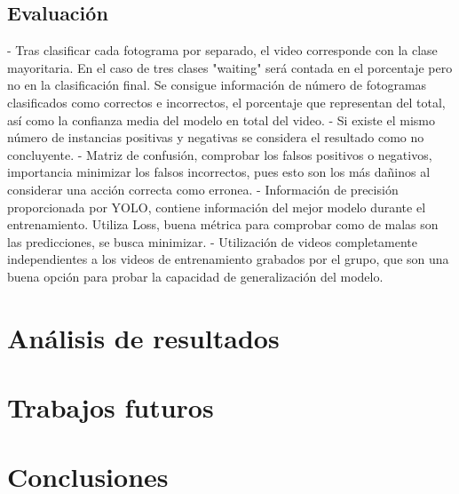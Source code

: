 \documentclass[12pt]{report} %
\begin{document}
    \section{Evaluación}
    - Tras clasificar cada fotograma por separado, el video corresponde con la clase mayoritaria. En el caso de tres clases "waiting" será contada en el porcentaje pero no en la clasificación final. Se consigue información de número de fotogramas clasificados como correctos e incorrectos, el porcentaje que representan del total, así como la confianza media del modelo en total del video.
    - Si existe el mismo número de instancias positivas y negativas se considera el resultado como no concluyente.
    - Matriz de confusión, comprobar los falsos positivos o negativos, importancia minimizar los falsos incorrectos, pues esto son los más dañinos al considerar una acción correcta como erronea.
    - Información de precisión proporcionada por YOLO, contiene información del mejor modelo durante el entrenamiento. Utiliza Loss, buena métrica para comprobar como de malas son las predicciones, se busca minimizar.
    - Utilización de videos completamente independientes a los videos de entrenamiento grabados por el grupo, que son una buena opción para probar la capacidad de generalización del modelo.


    \chapter{Análisis de resultados}
    \label{chap:resultados}

    \chapter{Trabajos futuros}
    \label{chap:future}

    \chapter{Conclusiones}
    \label{chap:conclusion}



    \clearpage

    \label{chap:bibliography}
    \printbibliography
\end{document}
